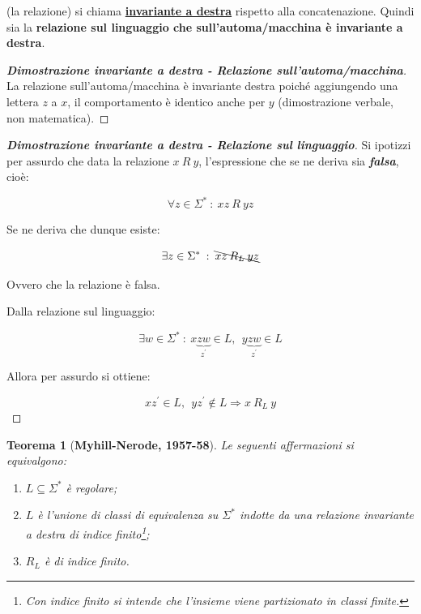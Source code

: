 \documentclass[a4paper]{article}
\newtheorem{theorem}{Teorema}
\begin{document}
	\noindent
	(la relazione) si chiama \textcolor{Red3}{\textbf{\underline{invariante a destra}}} rispetto alla concatenazione. Quindi sia la \textbf{relazione sul linguaggio che sull'automa/macchina è invariante a destra}.
	
	\newpage
	
	\begin{proof}[\textcolor{Red3}{\textbf{Dimostrazione invariante a destra - Relazione sull'automa/macchina}}]
		La relazione sull'automa/macchina è invariante destra poiché aggiungendo una lettera $z$ a $x$, il comportamento è identico anche per $y$ (dimostrazione verbale, non matematica).
	\end{proof}

	\begin{proof}[\textcolor{Red3}{\textbf{Dimostrazione invariante a destra - Relazione sul linguaggio}}]
		Si ipotizzi per assurdo che data la relazione $x \: R \: y$, l'espressione che se ne deriva sia \textbf{\emph{falsa}}, cioè:
		
		\begin{equation*}
			\forall z \in \Sigma^{*}  \: : \: xz \: R \: yz
		\end{equation*}
	
		\noindent
		Se ne deriva che dunque esiste:
		
		\begin{equation*}
			\exists z \in \Sigma^{*} \: : \: \bcancel{xz \: R_{L} \: yz}
		\end{equation*}
	
		\noindent
		Ovvero che la relazione è falsa.
		
		\noindent
		Dalla relazione sul linguaggio:
		
		\begin{equation*}
			\exists w \in \Sigma^{*} \: : \: x\underbrace{zw}_{z^{'}} \in L, \:\: y\underbrace{zw}_{z^{'}} \in L
		\end{equation*}
	
		\noindent
		Allora per assurdo si ottiene:
		
		\begin{equation*}
			xz^{'} \in L, \:\: yz^{'} \notin L \Longrightarrow x \: R_{L} \: y
		\end{equation*}
	\end{proof}
	
	\newpage
	
	\begin{theorem}[\textbf{Myhill-Nerode, 1957-58}]
		Le seguenti affermazioni si equivalgono:
		
		\begin{enumerate}
			\item $L \subseteq \Sigma^{*}$ è regolare;
			
			\item $L$ è l'unione di classi di equivalenza su $\Sigma^{*}$ indotte da una relazione invariante a destra di indice finito\footnote{Con indice finito si intende che l'insieme viene \emph{partizionato} in classi finite.};
			
			\item $R_{L}$ è di indice finito.
		\end{enumerate}
	\end{theorem}
\end{document}
